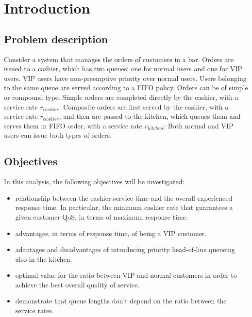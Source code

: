 \section{Introduction}

\subsection{Problem description}
Consider a system that manages the orders of customers in a bar. Orders are issued to a cashier, which
has two queues: one for normal users and one for VIP users. VIP users have non-preemptive priority
over normal users. Users belonging to the same queue are served according to a FIFO policy.
Orders can be of simple or compound type. Simple orders are completed directly by the cashier, with
a service rate $r_{cashier}$. Composite orders are first served by the cashier, with a service rate $r_{cashier}$, and
then are passed to the kitchen, which queues them and serves them in FIFO order, with a service rate
$r_{kitchen}$: Both normal and VIP users can issue both types of orders.

\subsection{Objectives}
In this analysis, the following objectives will be investigated:
\begin{itemize}
    \item relationship between the cashier service time and the overall experienced
        response time. In particular, the minimum cashier rate that guarantees a 
        given customer QoS, in terms of maximum response time.
    \item advantages, in terms of response time, of being a VIP customer.
    \item adantages and disadvantages of introducing priority head-of-line queueing
        also in the kitchen.
    \item optimal value for the ratio between VIP and normal customers in order to achieve the best overall quality of service.
    \item demonstrate that queue lengths don't depend on the ratio between the service rates.
\end{itemize}

